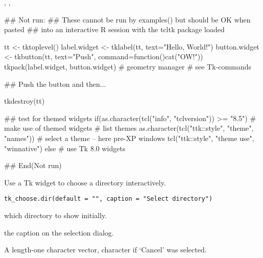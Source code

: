 %
\begin{SeeAlso}\relax
{}, ,
\end{SeeAlso}
%
\begin{Examples}
\begin{ExampleCode}
## Not run: 
## These cannot be run by examples() but should be OK when pasted
## into an interactive R session with the tcltk package loaded

tt <- tktoplevel()
label.widget <- tklabel(tt, text="Hello, World!")
button.widget <- tkbutton(tt, text="Push",
                          command=function()cat("OW!\n"))
tkpack(label.widget, button.widget) # geometry manager
                                    # see Tk-commands

## Push the button and then...

tkdestroy(tt)

## test for themed widgets
if(as.character(tcl("info", "tclversion")) >= "8.5") {
  # make use of themed widgets
  # list themes
  as.character(tcl("ttk::style", "theme", "names"))
  # select a theme -- here pre-XP windows
  tcl("ttk::style", "theme use", "winnative")
} else {
  # use Tk 8.0 widgets
}

## End(Not run)
\end{ExampleCode}
\end{Examples}
%
\begin{Description}\relax
Use a Tk widget to choose a directory interactively.
\end{Description}
%
\begin{Usage}
\begin{verbatim}
tk_choose.dir(default = "", caption = "Select directory")
\end{verbatim}
\end{Usage}
%
\begin{Arguments}
\begin{ldescription}
\item[\code{default}] which directory to show initially.
\item[\code{caption}] the caption on the selection dialog.
\end{ldescription}
\end{Arguments}
%
\begin{Value}
A length-one character vector, character  if
`Cancel' was selected. 
\end{Value}
